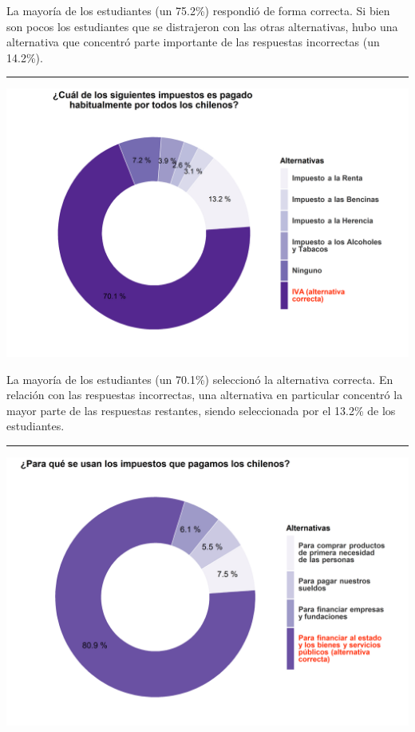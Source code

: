 \documentclass[
  14pt,
]{book}
\let\origfigure\figure
\let\endorigfigure\endfigure
\renewenvironment{figure}[1][2] {
  \expandafter\origfigure\expandafter[H]
} {
  \endorigfigure
}
\begin{document}
La mayoría de los estudiantes (un 75.2\%) respondió de forma correcta. Si bien son pocos los estudiantes que se distrajeron con las otras alternativas, hubo una alternativa que concentró parte importante de las respuestas incorrectas (un 14.2\%).

\begin{center}\rule{0.5\linewidth}{0.5pt}\end{center}

\begin{figure}[!ht]

{\centering \includegraphics[width=0.8\linewidth,]{images/ccivico_7} 

}

\caption{Impuesto pagado por todos los chilenos}\label{fig:unnamed-chunk-11}
\end{figure}

La mayoría de los estudiantes (un 70.1\%) seleccionó la alternativa correcta. En relación con las respuestas incorrectas, una alternativa en particular concentró la mayor parte de las respuestas restantes, siendo seleccionada por el 13.2\% de los estudiantes.

\begin{center}\rule{0.5\linewidth}{0.5pt}\end{center}

\begin{figure}[!ht]

{\centering \includegraphics[width=0.8\linewidth,]{images/ccivico_8} 

}

\caption{Uso de los impuestos en Chile}\label{fig:unnamed-chunk-12}
\end{figure}
\end{document}
